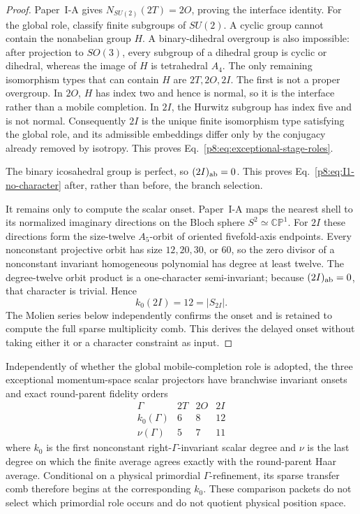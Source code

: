 \documentclass[12pt,a4paper]{article}
\begin{document}
\begin{proof}
Paper~I-A gives \(N_{SU(2)}(2T)=2O\), proving the interface identity.
For the global role, classify finite subgroups of \(SU(2)\).  A cyclic group
cannot contain the nonabelian group \(H\).  A binary-dihedral overgroup is
also impossible: after projection to \(SO(3)\), every subgroup of a dihedral
group is cyclic or dihedral, whereas the image of \(H\) is tetrahedral
\(A_4\).  The only remaining isomorphism types that can contain \(H\) are
\(2T,2O,2I\).  The first is not a proper overgroup.  In \(2O\), \(H\) has
index two and hence is normal, so it is the interface rather than a mobile
completion.  In \(2I\), the Hurwitz subgroup has index five and is not
normal.  Consequently \(2I\) is the unique finite isomorphism type satisfying
the global role, and its admissible embeddings differ only by the conjugacy
already removed by isotropy.  This proves Eq.~\eqref{p8:eq:exceptional-stage-roles}.

The binary icosahedral group is perfect, so
\((2I)_{\rm ab}=0\).  This proves Eq.~\eqref{p8:eq:I1-no-character} after,
rather than before, the branch selection.

It remains only to compute the scalar onset.  Paper~I-A maps the nearest shell
to its normalized imaginary directions on the Bloch sphere
\(S^2\simeq\mathbb {CP}^1\).  For \(2I\) these directions form the
size-twelve \(A_5\)-orbit of oriented fivefold-axis endpoints.  Every
nonconstant projective orbit has size \(12,20,30\), or \(60\), so the zero
divisor of a nonconstant invariant homogeneous polynomial has degree at least
twelve.  The degree-twelve orbit product is a one-character semi-invariant;
because \((2I)_{\rm ab}=0\), that character is trivial.  Hence
\[
 \boxed{k_0(2I)=12=|S_{2I}|.}
\]
The Molien series below independently confirms the onset and is retained to
compute the full sparse multiplicity comb.  This derives the delayed onset
without taking either it or a character constraint as input.
\end{proof}


\begin{proposition}
\label{p8:prop:v236-primordial-exceptional-atlas}
Independently of whether the global mobile-completion role is adopted, the
three exceptional momentum-space scalar projectors have branchwise invariant
onsets and exact round-parent fidelity orders
\[
 \boxed{
 \begin{array}{c|ccc}
 \Gamma&2T&2O&2I\\ \hline
 k_0(\Gamma)&6&8&12\\
 \nu(\Gamma)&5&7&11
 \end{array}}
\]
where \(k_0\) is the first nonconstant right-\(\Gamma\)-invariant scalar degree
and \(\nu\) is the last degree on which the finite average agrees exactly
with the round-parent Haar average.  Conditional on a physical primordial
\(\Gamma\)-refinement, its sparse transfer comb therefore begins at the
corresponding \(k_0\).  These comparison packets do not select which
primordial role occurs and do not quotient physical position space.
\end{proposition}
\end{document}
